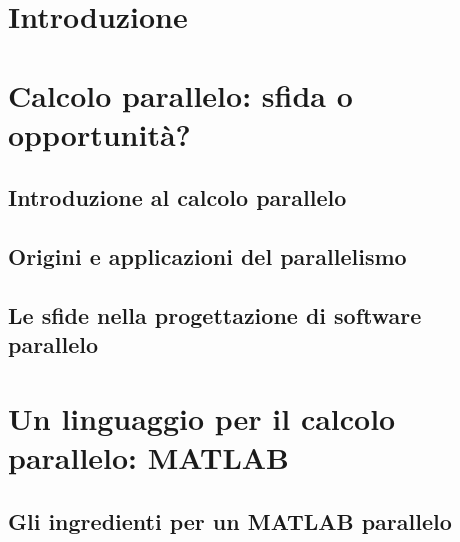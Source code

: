 \documentclass[
	a4paper,
	twoside,
	12pt
]{book}
\begin{document}
\frontmatter
\tableofcontents
\mainmatter
\chapter*{Introduzione}
\label{cap:introduzione}

\chapter{Calcolo parallelo: sfida o opportunit\`a?}
\label{cap:calcoloParalleloSfidaOpportunita}

\section{Introduzione al calcolo parallelo}
\label{par:introduzioneCalcoloParallelo}
\nocite{Patterson2022}
\nocite{Silberschatz2014}

\section{Origini e applicazioni del parallelismo}
\label{par:causeParallelismo}
\nocite{Hennessy2019}

\section{Le sfide nella progettazione di software parallelo}
\label{par:sfideSoftwareParallelo}

\chapter{Un linguaggio per il calcolo parallelo: MATLAB}
\label{cap:unLinguaggioPerIlCalcoloParalleloMATLAB}

\section{Gli ingredienti per un MATLAB parallelo}
\nocite{Sharma2009}
\label{par:ingredientiMATLABParallelo}

\end{document}
